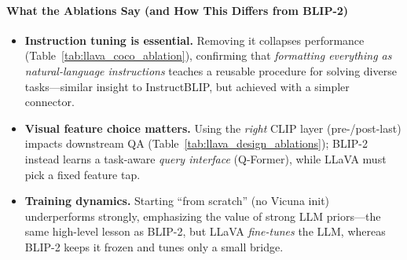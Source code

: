 \begin{enrichment}
\begin{enrichment}
        \begin{table}[H]
            \centering
            \small
            \setlength{\tabcolsep}{10pt}
            \caption{Design ablations on ScienceQA (Average \%). Differences vs.\ best variant in parentheses. Source:\cite{liu2023_llava}.}
            \label{tab:llava_design_ablations}
        \end{table}
        
        \paragraph{What the Ablations Say (and How This Differs from BLIP-2)}
        \begin{itemize}
            \item \textbf{Instruction tuning is essential.} Removing it collapses performance (Table~\ref{tab:llava_coco_ablation}), confirming that \emph{formatting everything as natural-language instructions} teaches a reusable procedure for solving diverse tasks—similar insight to InstructBLIP, but achieved with a simpler connector.
            \item \textbf{Visual feature choice matters.} Using the \emph{right} CLIP layer (pre-/post-last) impacts downstream QA (Table~\ref{tab:llava_design_ablations}); BLIP-2 instead learns a task-aware \emph{query interface} (Q-Former), while 
            LLaVA must pick a fixed feature tap.
            
            \newpage
            
            \item \textbf{Training dynamics.} Starting “from scratch” (no Vicuna init) underperforms strongly, emphasizing the value of strong LLM priors—the same high-level lesson as BLIP-2, but LLaVA \emph{fine-tunes} the LLM, whereas BLIP-2 keeps it frozen and tunes only a small bridge.
        \end{itemize}
        

\end{enrichment}
\end{enrichment}
